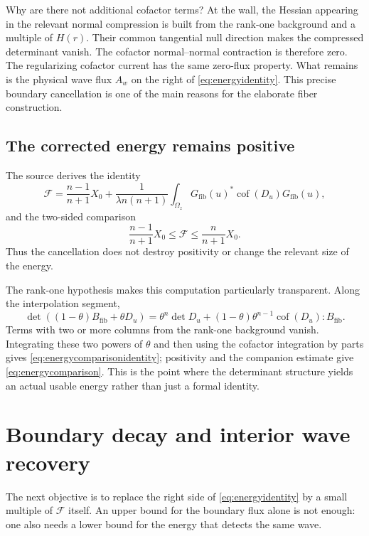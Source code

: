 \documentclass[11pt,a4paper]{article}
\numberwithin{equation}{section}
\theoremstyle{definition}
\theoremstyle{remark}
\begin{document}
Why are there not additional cofactor terms? At the wall, the Hessian appearing
in the relevant normal compression is built from the rank-one background and
a multiple of $H(r)$. Their common tangential null direction makes the
compressed determinant vanish. The cofactor normal--normal contraction is
therefore zero. The regularizing cofactor current has the same zero-flux
property. What remains is the physical wave flux $A_w$ on the right of
\eqref{eq:energyidentity}. This precise boundary cancellation is one of the
main reasons for the elaborate fiber construction.

\subsection{The corrected energy remains positive}
The source derives the identity
\begin{equation}\label{eq:energycomparisonidentity}
 \mathcal F=\frac{n-1}{n+1}X_0+
 \frac{1}{\lambda n(n+1)}
 \int_{\Omega_z}G_{\mathrm{fib}}(u)^*
              \operatorname{cof}(D_u)G_{\mathrm{fib}}(u),
\end{equation}
and the two-sided comparison
\begin{equation}\label{eq:energycomparison}
 \frac{n-1}{n+1}X_0\le\mathcal F\le\frac n{n+1}X_0.
\end{equation}
Thus the cancellation does not destroy positivity or change the relevant
size of the energy.

The rank-one hypothesis makes this computation particularly transparent. Along
the interpolation segment,
\[
 \det((1-\theta)B_{\mathrm{fib}}+\theta D_u)
 =\theta^n\det D_u+
  (1-\theta)\theta^{n-1}\operatorname{cof}(D_u):B_{\mathrm{fib}}.
\]
Terms with two or more columns from the rank-one background vanish. Integrating
these two powers of $\theta$ and then using the cofactor integration by parts
gives \eqref{eq:energycomparisonidentity}; positivity and the companion estimate
give \eqref{eq:energycomparison}. This is the point where the determinant
structure yields an actual usable energy rather than just a formal identity.

\section{Boundary decay and interior wave recovery}
\label{sec:barriers}
The next objective is to replace the right side of
\eqref{eq:energyidentity} by a small multiple of $\mathcal F$ itself.
An upper bound for the boundary flux alone is not enough: one also needs a
lower bound for the energy that detects the same wave.
\end{document}
